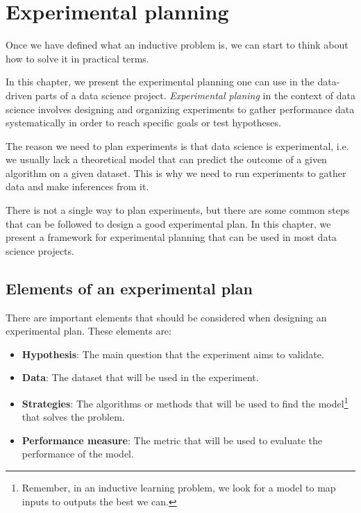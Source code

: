 \chapter{Experimental planning}
\label{chap:planning}


Once we have defined what an inductive problem is, we can start to think about how to
solve it in practical terms.

In this chapter, we present the experimental planning one can use in the data-driven
parts of a data science project.  \emph{Experimental planing}  in the context of data
science involves designing and organizing experiments to gather performance data
systematically in order to reach specific goals or test hypotheses.

The reason we need to plan experiments is that data science is experimental, i.e. we
usually lack a theoretical model that can predict the outcome of a given algorithm on a
given dataset.  This is why we need to run experiments to gather data and make
inferences from it.

There is not a single way to plan experiments, but there are some common steps that can
be followed to design a good experimental plan.  In this chapter, we present a
framework for experimental planning that can be used in most data science projects.

\section{Elements of an experimental plan}

There are important elements that should be considered when designing an experimental
plan.  These elements are:
\begin{itemize}
  \item \textbf{Hypothesis}: The main question that the experiment aims to validate.
  \item \textbf{Data}: The dataset that will be used in the experiment.
  \item \textbf{Strategies}: The algorithms or methods that will be used to find the
    model\footnote{Remember, in an inductive learning problem, we look for a model to
    map inputs to outputs the best we can.} that solves the problem.
  \item \textbf{Performance measure}: The metric that will be used to evaluate the
    performance of the model.
\end{itemize}

